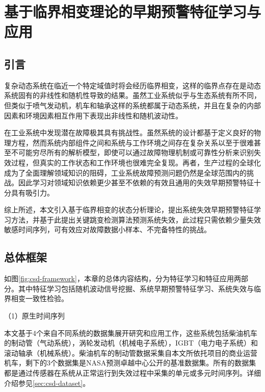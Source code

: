 
\chapter{基于临界相变理论的早期预警特征学习与应用}
\label{chap:critical-transection}

\section{引言}



复杂动态系统在临近一个特定域值时将会经历临界相变\cite{ladyman2013complex}，这样的临界点存在是动态系统固有的非线性和随机性导致的结果\cite{bar1997dynamics,endy2005foundations}。虽然工业系统似乎与生态系统有所不同，但类似于喷气发动机，机车和轴承这样的系统都属于动态系统，并且在复杂的内部因素和环境因素相互作用下表现出非线性和随机波动性\cite{strogatz2018nonlinear,cotilla2012predicting}。

在工业系统中发现潜在故障极其具有挑战性。虽然系统的设计都基于定义良好的物理方程，然而系统内部组件之间和系统与工作环境之间存在复杂关系以至于很难甚至不可能穷尽所有的解析模型\cite{chan2007data}，即使可以通过故障物理机制或可靠性分析来识别失效过程，但真实的工作状态和工作环境也很难完全复现。再者，生产过程的全球化成为了全面理解领域知识的阻碍，工业系统故障预测问题仍然是全球范围内的挑战。因此学习对领域知识依赖更少甚至不依赖的有效且通用的失效早期预警特征十分具有吸引力。

综上所述，本文引入基于临界相变的状态分析理论，提出系统失效早期预警特征学习方法，并基于此提出关键跳变检测算法预测系统失效，此过程只需依赖少量失效敏感时间序列，可有效应对故障数据小样本、不完备特性的挑战。

\section{总体框架}
\label{sec:csd-framework}

如图\ref{fig:csd-framework}，本章的总体内容结构，分为特征学习和特征应用两部分。其中特征学习包括随机波动信号挖掘、系统早期预警特征学习、系统失效与临界相变一致性检验。

（1）原生时间序列

本文基于4个来自不同系统的数据集展开研究和应用工作，这些系统包括柴油机车的制动管（气动系统），涡轮发动机（机械电子系统），IGBT（电力电子系统）和滚动轴承（机械系统）。柴油机车的制动管数据采集自本文所依托项目的商业运营机车，剩下的3个数据集是NASA预测卓越中心公开的基准数据集\cite{nasa2018}。所有的数据集都是通过传感器在系统从正常运行到失效过程中采集的单元或多元时间序列。详细介绍参见\ref{sec:csd-dataset}。

